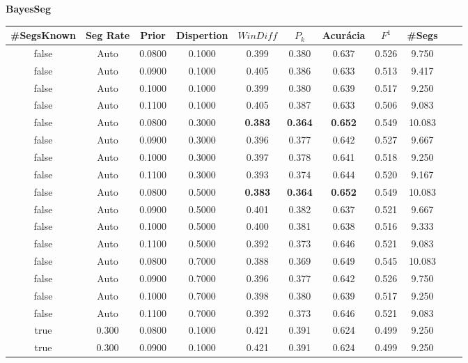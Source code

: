 \center
\textbf{BayesSeg}  
\begin{longtable}[c]{|c|c|c|c|c|c|c|c|c|c|c|} 
\hline 
 \#SegsKnown & Seg Rate & Prior & Dispertion & $WinDiff$ & $P_k$ & Acurácia & $F^1$ & \#Segs\\ \hline 
 false & Auto & 0.0800 & 0.1000 & 0.399 & 0.380 & 0.637 & 0.526 & 9.750  \\ \hline 
 false & Auto & 0.0900 & 0.1000 & 0.405 & 0.386 & 0.633 & 0.513 & 9.417  \\ \hline 
 false & Auto & 0.1000 & 0.1000 & 0.399 & 0.380 & 0.639 & 0.517 & 9.250  \\ \hline 
 false & Auto & 0.1100 & 0.1000 & 0.405 & 0.387 & 0.633 & 0.506 & 9.083  \\ \hline 
 false & Auto & 0.0800 & 0.3000 & \cellcolor{gray!20} \textbf{0.383} & \cellcolor{gray!20} \textbf{0.364} & \cellcolor{gray!20} \textbf{0.652} & 0.549 & 10.083  \\ \hline 
 false & Auto & 0.0900 & 0.3000 & 0.396 & 0.377 & 0.642 & 0.527 & 9.667  \\ \hline 
 false & Auto & 0.1000 & 0.3000 & 0.397 & 0.378 & 0.641 & 0.518 & 9.250  \\ \hline 
 false & Auto & 0.1100 & 0.3000 & 0.393 & 0.374 & 0.644 & 0.520 & 9.167  \\ \hline 
 false & Auto & 0.0800 & 0.5000 & \cellcolor{gray!20} \textbf{0.383} & \cellcolor{gray!20} \textbf{0.364} & \cellcolor{gray!20} \textbf{0.652} & 0.549 & 10.083  \\ \hline 
 false & Auto & 0.0900 & 0.5000 & 0.401 & 0.382 & 0.637 & 0.521 & 9.667  \\ \hline 
 false & Auto & 0.1000 & 0.5000 & 0.400 & 0.381 & 0.638 & 0.516 & 9.333  \\ \hline 
 false & Auto & 0.1100 & 0.5000 & 0.392 & 0.373 & 0.646 & 0.521 & 9.083  \\ \hline 
 false & Auto & 0.0800 & 0.7000 & 0.388 & 0.369 & 0.649 & 0.545 & 10.083  \\ \hline 
 false & Auto & 0.0900 & 0.7000 & 0.396 & 0.377 & 0.642 & 0.526 & 9.750  \\ \hline 
 false & Auto & 0.1000 & 0.7000 & 0.398 & 0.380 & 0.639 & 0.517 & 9.250  \\ \hline 
 false & Auto & 0.1100 & 0.7000 & 0.392 & 0.373 & 0.646 & 0.521 & 9.083  \\ \hline 
 true & 0.300 & 0.0800 & 0.1000 & 0.421 & 0.391 & 0.624 & 0.499 & 9.250  \\ \hline 
 true & 0.300 & 0.0900 & 0.1000 & 0.421 & 0.391 & 0.624 & 0.499 & 9.250  \\ \hline 

\end{longtable}
